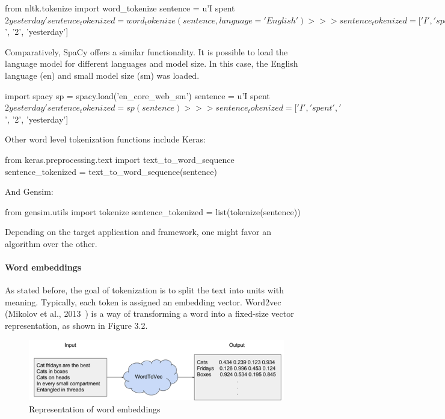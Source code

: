 \begin{python}
from nltk.tokenize import word_tokenize
sentence = u'I spent $2 yesterday'
sentence_tokenized = word_tokenize(sentence, language='English')
>>> sentence_tokenized = ['I', 'spent', '$', '2', 'yesterday']
\end{python}

Comparatively, SpaCy offers a similar functionality. It is possible to load the language model for different languages and model size. In this case, the English language (en) and small model size (sm) was loaded.

\begin{python}
import spacy
sp = spacy.load('en_core_web_sm')
sentence = u'I spent $2 yesterday'
sentence_tokenized = sp(sentence)
>>> sentence_tokenized = ['I', 'spent', '$', '2', 'yesterday']
\end{python}

Other word level tokenization functions include Keras:

\begin{python}
from keras.preprocessing.text import text_to_word_sequence
sentence_tokenized = text_to_word_sequence(sentence)
\end{python}

And Gensim:

\begin{python}
from gensim.utils import tokenize
sentence_tokenized = list(tokenize(sentence))
\end{python}

Depending on the target application and framework, one might favor an algorithm over the other.

\paragraph{Word embeddings}\label{subsec:wordemb}

As stated before, the goal of tokenization is to split the text into units with meaning. Typically, each token is assigned an embedding vector. Word2vec (Mikolov et al., 2013~\cite{mikolov2013efficient}) is a way of transforming a word into a fixed-size vector representation, as shown in Figure 3.2.

\begin{figure}[!ht]
    \centering
    \includegraphics[width=14cm]{figures/word_emb.png}
    \caption{Representation of word embeddings}
\end{figure}

